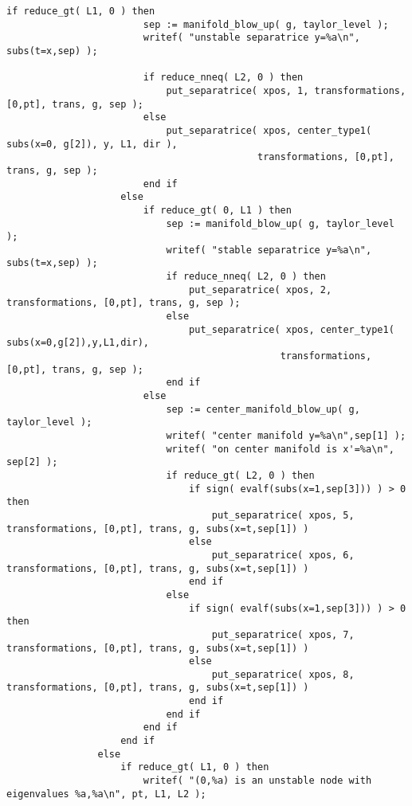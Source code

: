 \documentclass[a4paper,10pt]{article}
\begin{document}
\begin{lstlisting}[name=blowup]
                    if reduce_gt( L1, 0 ) then
                        sep := manifold_blow_up( g, taylor_level );
                        writef( "unstable separatrice y=%a\n", subs(t=x,sep) );

                        if reduce_nneq( L2, 0 ) then
                            put_separatrice( xpos, 1, transformations, [0,pt], trans, g, sep );
                        else
                            put_separatrice( xpos, center_type1( subs(x=0, g[2]), y, L1, dir ),
                                            transformations, [0,pt], trans, g, sep );
                        end if
                    else
                        if reduce_gt( 0, L1 ) then
                            sep := manifold_blow_up( g, taylor_level );
                            writef( "stable separatrice y=%a\n", subs(t=x,sep) );
                            if reduce_nneq( L2, 0 ) then
                                put_separatrice( xpos, 2, transformations, [0,pt], trans, g, sep );
                            else
                                put_separatrice( xpos, center_type1( subs(x=0,g[2]),y,L1,dir),
                                                transformations, [0,pt], trans, g, sep );
                            end if
                        else
                            sep := center_manifold_blow_up( g, taylor_level );
                            writef( "center manifold y=%a\n",sep[1] );
                            writef( "on center manifold is x'=%a\n", sep[2] );
                            if reduce_gt( L2, 0 ) then
                                if sign( evalf(subs(x=1,sep[3])) ) > 0 then
                                    put_separatrice( xpos, 5, transformations, [0,pt], trans, g, subs(x=t,sep[1]) )
                                else
                                    put_separatrice( xpos, 6, transformations, [0,pt], trans, g, subs(x=t,sep[1]) )
                                end if
                            else
                                if sign( evalf(subs(x=1,sep[3])) ) > 0 then
                                    put_separatrice( xpos, 7, transformations, [0,pt], trans, g, subs(x=t,sep[1]) )
                                else
                                    put_separatrice( xpos, 8, transformations, [0,pt], trans, g, subs(x=t,sep[1]) )
                                end if
                            end if
                        end if
                    end if
                else
                    if reduce_gt( L1, 0 ) then
                        writef( "(0,%a) is an unstable node with eigenvalues %a,%a\n", pt, L1, L2 );


\end{lstlisting}
\end{document}
